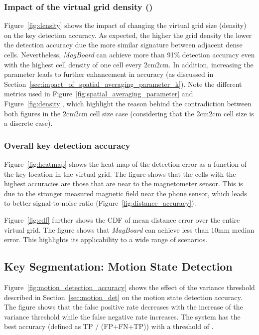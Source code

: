 \documentclass[conference]{IEEEtran}
\def \sys {\textit{MagBoard}}
\begin{document}
\subsubsection{Impact of the virtual grid density ()}
Figure~\ref{fig:density} shows the impact of changing the virtual grid size (density) on the key detection accuracy. As expected, the higher the grid density the lower the detection accuracy due the more similar signature between adjacent dense cells. Nevertheless, \sys{} can achieve more than 91\% detection accuracy even with the highest cell density of one cell every 2cm2cm. In addition, increasing the  parameter leads to further enhancement in accuracy (as discussed in Section~\ref{sec:impact_of_spatial_averaging_parameter_k}). Note the different metrics used in  Figure~\ref{fig:spatial_averaging_parameter} and Figure~\ref{fig:density}, which highlight the reason behind the contradiction between both figures in the 2cm2cm cell size case (considering that the 2cm2cm cell size is a discrete case). 

\subsubsection{Overall key detection accuracy}
Figure~\ref{fig:heatmap} shows the heat map of the detection error as a function of the key location in the virtual grid. The figure shows that the cells with the highest accuracies are those that are near to the magnetometer sensor. This is due to the stronger measured magnetic field near the phone sensor, which leads to better signal-to-noise ratio (Figure~\ref{fig:distance_accuracy}).

Figure~\ref{fig:cdf} further shows the CDF of mean distance error over the entire virtual grid. The figure shows that \sys{} can achieve 
less than 10mm median error. 
This highlights its applicability to a wide range of scenarios. 

\subsection{Key Segmentation: Motion State Detection}
\label{sec:motion_res}
Figure~\ref{fig:motion_detection_accuracy} shows the effect of the variance threshold  described in Section~\ref{sec:motion_det} on the motion state detection accuracy.  The figure shows that the false positive rate decreases with the increase of the variance threshold while the false negative rate increases. The system has the best accuracy (defined as TP / (FP+FN+TP)) with a threshold of .
\end{document}
